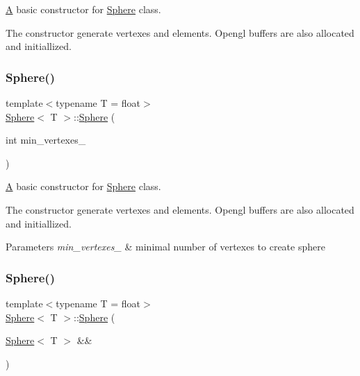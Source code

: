 \mbox{\hyperlink{classA}{A}} basic constructor for \mbox{\hyperlink{classSphere}{Sphere}} class. 

The constructor generate vertexes and elements. Opengl buffers are also allocated and initiallized. \mbox{\label{classSphere_a79e3c1cb536e3fe4d8bc447e7be0e414}} 
\subsubsection{\texorpdfstring{Sphere()}{Sphere()}\hspace{0.1cm}{\footnotesize\ttfamily [2/4]}}
{\footnotesize\ttfamily template$<$typename T = float$>$ \\
\mbox{\hyperlink{classSphere}{Sphere}}$<$ T $>$\+::\mbox{\hyperlink{classSphere}{Sphere}} (\begin{DoxyParamCaption}\item[{int}]{min\+\_\+vertexes\+\_\+ }\end{DoxyParamCaption})\hspace{0.3cm}{\ttfamily [inline]}}



\mbox{\hyperlink{classA}{A}} basic constructor for \mbox{\hyperlink{classSphere}{Sphere}} class. 

The constructor generate vertexes and elements. Opengl buffers are also allocated and initiallized. 
\begin{DoxyParams}{Parameters}
{\em min\+\_\+vertexes\+\_\+} & minimal number of vertexes to create sphere \\
\hline
\end{DoxyParams}
\mbox{\label{classSphere_af0d667b078ae88955113205112d9aaa6}} 
\subsubsection{\texorpdfstring{Sphere()}{Sphere()}\hspace{0.1cm}{\footnotesize\ttfamily [3/4]}}
{\footnotesize\ttfamily template$<$typename T = float$>$ \\
\mbox{\hyperlink{classSphere}{Sphere}}$<$ T $>$\+::\mbox{\hyperlink{classSphere}{Sphere}} (\begin{DoxyParamCaption}\item[{\mbox{\hyperlink{classSphere}{Sphere}}$<$ T $>$ \&\&}]{ }\end{DoxyParamCaption})\hspace{0.3cm}{\ttfamily [default]}}

